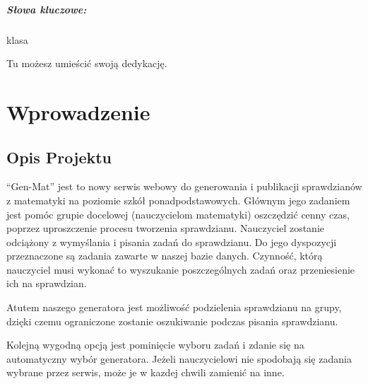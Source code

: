 \documentclass[oneside,polski,logo,indent]{amuthesis}
\author{Jan Kowalski}
\date{Poznań, wrzesień 2017}
\begin{document}
\maketitle
\makestatement

\begin{streszczenie}
\lipsum[1]

\paragraph{Słowa kluczowe:} klasa
\end{streszczenie}

\begin{dedykacja}
Tu możesz umieścić swoją dedykację.
\end{dedykacja}

\tableofcontents


\chapter{Wprowadzenie}

\section{Opis Projektu}

“Gen-Mat” jest to nowy serwis webowy do generowania i publikacji sprawdzianów z matematyki na poziomie szkół ponadpodstawowych. Głównym jego zadaniem jest pomóc grupie docelowej (nauczycielom matematyki) oszczędzić cenny czas, poprzez uproszczenie procesu tworzenia sprawdzianu. Nauczyciel zostanie odciążony z wymyślania i pisania zadań do sprawdzianu. Do jego dyspozycji przeznaczone są zadania zawarte w naszej bazie danych. Czynność, którą nauczyciel musi wykonać to wyszukanie poszczególnych zadań oraz przeniesienie ich na sprawdzian.

Atutem naszego generatora jest możliwość podzielenia sprawdzianu na grupy, dzięki czemu ograniczone zostanie oszukiwanie podczas pisania sprawdzianu.

Kolejną wygodną opcją jest pominięcie wyboru zadań i zdanie się na automatyczny wybór generatora. Jeżeli nauczycielowi nie spodobają się zadania wybrane przez serwis, może je w kazdej chwili zamienić na inne.
\end{document}
